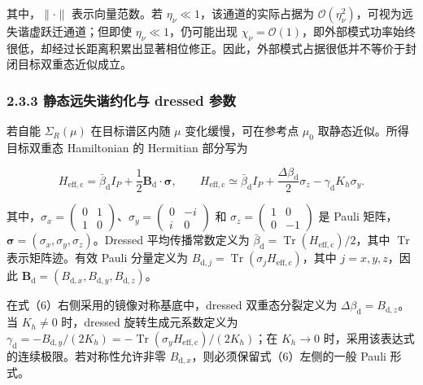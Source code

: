 \documentclass[
  UTF8,
  zihao=-4,
  fontset=fandol]{ctexart}
\begin{document}
其中，\(\|\cdot\|\) 表示向量范数。若
\(\eta_\nu\ll1\)，该通道的实际占据为
\(\mathcal O(\eta_\nu^2)\)，可视为远失谐虚跃迁通道；但即使
\(\eta_\nu\ll1\)，仍可能出现
\(\chi_\nu=\mathcal O(1)\)，即外部模式功率始终很低，却经过长距离积累出显著相位修正。因此，外部模式占据很低并不等价于封闭目标双重态近似成立。

\hypertarget{ux9759ux6001ux8fdcux5931ux8c10ux7ea6ux5316ux4e0e-dressed-ux53c2ux6570}{%
\subsubsection{2.3.3 静态远失谐约化与 dressed
参数}\label{ux9759ux6001ux8fdcux5931ux8c10ux7ea6ux5316ux4e0e-dressed-ux53c2ux6570}}

若自能 \(\Sigma_R(\mu)\) 在目标谱区内随 \(\mu\) 变化缓慢，可在参考点
\(\mu_0\) 取静态近似。所得目标双重态 Hamiltonian 的 Hermitian 部分写为

\[
H_{\mathrm{eff,c}}=\bar\beta_{\mathrm d}I_P+\frac12\mathbf B_{\mathrm d}\cdot\symbf{\sigma},\qquad
H_{\mathrm{eff,c}}\simeq
\bar\beta_{\mathrm d}I_P+\frac{\Delta\beta_{\mathrm d}}{2}\sigma_z-\gamma_{\mathrm d}K_h\sigma_y.
\tag{6}
\]

其中，\(\sigma_x=\left(\begin{smallmatrix}0&1\\1&0\end{smallmatrix}\right)\)、\(\sigma_y=\left(\begin{smallmatrix}0&-i\\i&0\end{smallmatrix}\right)\)
和
\(\sigma_z=\left(\begin{smallmatrix}1&0\\0&-1\end{smallmatrix}\right)\)
是 Pauli 矩阵，\(\symbf{\sigma}=(\sigma_x,\sigma_y,\sigma_z)\)。Dressed
平均传播常数定义为
\(\bar\beta_{\mathrm d}=\operatorname{Tr}(H_{\mathrm{eff,c}})/2\)，其中
\(\operatorname{Tr}\) 表示矩阵迹。有效 Pauli 分量定义为
\(B_{\mathrm d,j}=\operatorname{Tr}(\sigma_jH_{\mathrm{eff,c}})\)，其中
\(j=x,y,z\)，因此
\(\mathbf B_{\mathrm d}=(B_{\mathrm d,x},B_{\mathrm d,y},B_{\mathrm d,z})\)。

在式（6）右侧采用的镜像对称基底中，dressed 双重态分裂定义为
\(\Delta\beta_{\mathrm d}=B_{\mathrm d,z}\)。当 \(K_h\neq0\) 时，dressed
旋转生成元系数定义为
\(\gamma_{\mathrm d}=-B_{\mathrm d,y}/(2K_h)=-\operatorname{Tr}(\sigma_yH_{\mathrm{eff,c}})/(2K_h)\)；在
\(K_h\rightarrow0\) 时，采用该表达式的连续极限。若对称性允许非零
\(B_{\mathrm d,x}\)，则必须保留式（6）左侧的一般 Pauli 形式。
\end{document}
